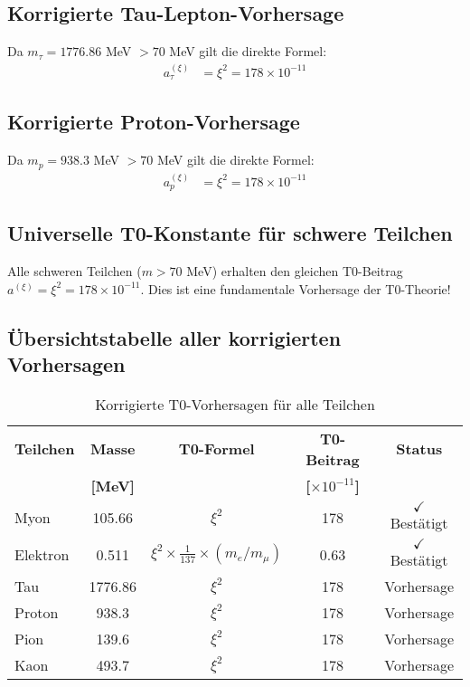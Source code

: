 \documentclass[12pt,a4paper]{article}
\newcommand{\xipar}{\xi}
\begin{document}
	\subsection{Korrigierte Tau-Lepton-Vorhersage}
	
	Da $m_\tau = 1776.86$ MeV $> 70$ MeV gilt die direkte Formel:
	\begin{align}
		a_\tau^{(\xipar)} &= \xipar^2 = 178 \times 10^{-11}
	\end{align}
	
	\subsection{Korrigierte Proton-Vorhersage}
	
	Da $m_p = 938.3$ MeV $> 70$ MeV gilt die direkte Formel:
	\begin{align}
		a_p^{(\xipar)} &= \xipar^2 = 178 \times 10^{-11}
	\end{align}
	
	\subsection{Universelle T0-Konstante für schwere Teilchen}
	
	\begin{wichtig}
		Alle schweren Teilchen ($m > 70$ MeV) erhalten den gleichen T0-Beitrag $a^{(\xipar)} = \xipar^2 = 178 \times 10^{-11}$. Dies ist eine fundamentale Vorhersage der T0-Theorie!
	\end{wichtig}
	
	\subsection{Übersichtstabelle aller korrigierten Vorhersagen}
	
	\begin{table}[H]
		\centering
		\caption{Korrigierte T0-Vorhersagen für alle Teilchen}
		\begin{tabular}{@{}lcccc@{}}
			\toprule
			\textbf{Teilchen} & \textbf{Masse} & \textbf{T0-Formel} & \textbf{T0-Beitrag} & \textbf{Status} \\
			& \textbf{[MeV]} & & \textbf{[$\times 10^{-11}$]} & \\
			\midrule
			\rowcolor{green!30}
			Myon & 105.66 & $\xipar^2$ & 178 & $\checkmark$ Bestätigt \\
			\rowcolor{green!30}
			Elektron & 0.511 & $\xipar^2 \times \frac{1}{137} \times (m_e/m_\mu)$ & 0.63 & $\checkmark$ Bestätigt \\
			\rowcolor{blue!20}
			Tau & 1776.86 & $\xipar^2$ & 178 & Vorhersage \\
			\rowcolor{blue!20}
			Proton & 938.3 & $\xipar^2$ & 178 & Vorhersage \\
			\rowcolor{yellow!10}
			Pion & 139.6 & $\xipar^2$ & 178 & Vorhersage \\
			\rowcolor{yellow!10}
			Kaon & 493.7 & $\xipar^2$ & 178 & Vorhersage \\
			\bottomrule
		\end{tabular}
	\end{table}
	
\end{document}
